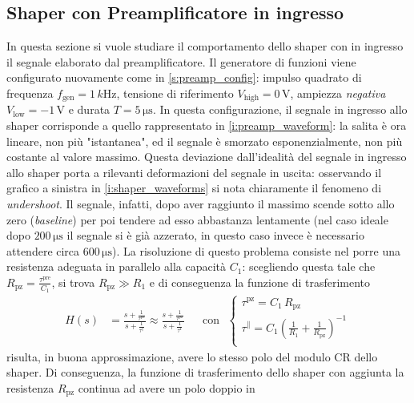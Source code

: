 \documentclass[a4paper,11pt]{article} %
\begin{document}
\subsection{Shaper con Preamplificatore in ingresso}\label{s:shaper_preamp}

In questa sezione si vuole studiare il comportamento dello shaper con in ingresso il segnale elaborato dal
preamplificatore. Il generatore di funzioni viene configurato nuovamente come in \autoref{s:preamp_config}: impulso
quadrato di frequenza $f_{\text{gen}} = 1 \,\si{k\Hz}$, tensione di riferimento $V_{\text{high}} = 0 \,\si{\volt}$,
ampiezza \textit{negativa} $V_{\text{low}} = -1 \,\si{\volt}$ e durata $T = 5 \,\si{\us}$. In questa configurazione, il
segnale in ingresso allo shaper corrisponde a quello rappresentato in \autoref{i:preamp_waveform}: la salita è ora
lineare, non più "istantanea", ed il segnale è smorzato esponenzialmente, non più costante al valore massimo. Questa
deviazione dall'idealità del segnale in ingresso allo shaper porta a rilevanti deformazioni del segnale in uscita:
osservando il grafico a sinistra in \autoref{i:shaper_waveforms} si nota chiaramente il fenomeno di \textit{undershoot}.
Il segnale, infatti, dopo aver raggiunto il massimo scende sotto allo zero (\textit{baseline}) per poi tendere ad esso
abbastanza lentamente (nel caso ideale dopo $200\,\si{\us}$ il segnale si è già azzerato, in questo caso invece è
necessario attendere circa $600\,\si{\us}$). La risoluzione di questo problema consiste nel porre una resistenza
adeguata in parallelo alla capacità $C_{1}$: scegliendo questa tale che $R_{\text{pz}} =
\frac{\tau^{\text{pre}}}{C_{1}}$, si trova $R_{\text{pz}} \gg R_{1}$ e di conseguenza la funzione di trasferimento
\begin{align}
	H(s) &= 
		\frac{
			s + \frac{ 1 }{ \tau^{ \text{pz} } }
			}
			{
			s + \frac{ 1 }{ \tau^{ \parallel } }
			} 
		\approx
		\frac{
			s + \frac{ 1 }{ \tau^{ \text{pz} } }
			}
			{
			s + \frac{ 1 }{ \tau^{ \text{1} } }
			} &
	&\text{con} \,\,\,\,	
	\begin{cases}
		\tau^{ \text{pz} } = C_{ 1 }\, R_{ \text{pz} }  \\
		\tau^{ \parallel } = C_{ 1 }\left(\frac{1}{R_{1}}+\frac{1}{R_{\text{pz}}}\right)^{-1}\\
	\end{cases}	
\end{align}
\noindent risulta, in buona approssimazione, avere lo stesso polo del modulo CR dello shaper. Di conseguenza, la
funzione di trasferimento dello shaper con aggiunta la resistenza $R_{\text{pz}}$ continua ad avere un polo doppio in
\end{document}
